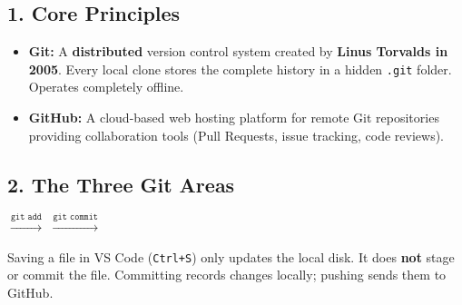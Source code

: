 \documentclass[a4paper,11pt]{article}
\begin{document}
\subsection{1. Core Principles}
\begin{itemize}[leftmargin=5mm]
    \item \textbf{Git:} A \textbf{distributed} version control system created by \textbf{Linus Torvalds in 2005}. Every local clone stores the complete history in a hidden \texttt{.git} folder. Operates completely offline.
    \item \textbf{GitHub:} A cloud-based web hosting platform for remote Git repositories providing collaboration tools (Pull Requests, issue tracking, code reviews).
\end{itemize}

\subsection{2. The Three Git Areas}
\begin{center}
 $\xrightarrow{\texttt{git add}}$  $\xrightarrow{\texttt{git commit}}$ 
\end{center}

\begin{examalert}
Saving a file in VS Code (\texttt{Ctrl+S}) only updates the local disk. It does \textbf{not} stage or commit the file. Committing records changes locally; pushing sends them to GitHub.
\end{examalert}
\end{document}
